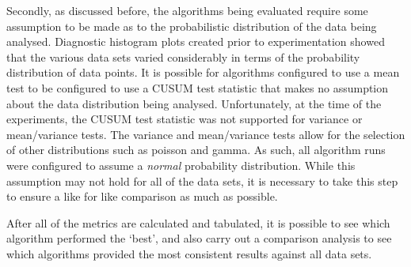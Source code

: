 \documentclass[../main.tex]{subfiles}
\begin{document}
Secondly, as discussed before, the algorithms being evaluated require some assumption to be made as to the probabilistic distribution of the data being analysed. Diagnostic histogram plots created prior to experimentation showed that the various data sets varied considerably in terms of the probability distribution of data points. It is possible for algorithms configured to use a mean test to be configured to use a CUSUM test statistic that makes no assumption about the data distribution being analysed. Unfortunately, at the time of the experiments, the CUSUM test statistic was not supported for variance or mean/variance tests. The variance and mean/variance tests allow for the selection of other distributions such as poisson and gamma. As such, all algorithm runs were configured to assume a \emph{normal} probability distribution. While this assumption may not hold for all of the data sets, it is necessary to take this step to ensure a like for like comparison as much as possible.

After all of the metrics are calculated and tabulated, it is possible to see which algorithm performed the `best', and also carry out a comparison analysis to see which algorithms provided the most consistent results against all data sets.
\end{document}
